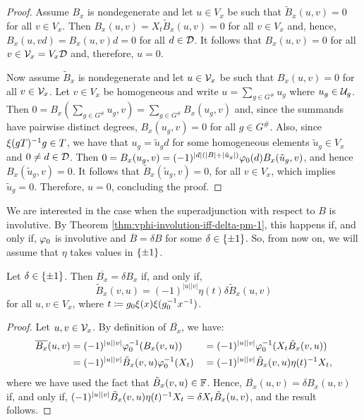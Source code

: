 \begin{proof}
	Assume $B_x$ is nondegenerate and let $u \in V_x$ be such that $\tilde{B}_x(u,v) = 0$ for all $v \in V_x$.
	Then $B_x(u, v) = X_{t} \tilde{B}_x(u,v) = 0$ for all $v \in V_x$ and, hence, $B_x(u, vd) = B_x(u, v)d = 0$ for all $d \in \mathcal{D}$.
	It follows that $B_x(u,v) = 0$ for all $v\in \mathcal V_x = V_x \mathcal{D}$ and, therefore, $u = 0$.

	Now assume $\tilde{B}_x$ is nondegenerate and let $u \in \mathcal V_x$ be such that $B_x (u,v) = 0$ for all $v \in \mathcal V_x$.
	Let $v\in V_x$ be homogeneous and write $u = \sum_{g\in G^\#} u_g$ where $u_g \in \mathcal U_g$.
	Then $0 = B_x(\sum_{g\in G^\#} u_g, v) = \sum_{g\in G^\#} B_x(u_g, v)$ and, since the summands have pairwise distinct degrees, $B_x(u_g, v) = 0$ for all $g\in G^\#$.
	Also, since $\xi(gT)^{-1} g \in T$, we have that $u_g = \tilde u_g d$ for some homogeneous elements $\tilde u_g \in V_x$ and $0 \neq d \in \mathcal{D}$.
	Then $0 = B_x(u_g, v) = (-1)^{|d|(|B| + |\tilde u_g|)} \varphi_0(d) B_x(\tilde u_g, v)$, and hence $B_x(\tilde u_g, v) = 0$.
	It follows that $\tilde{B}_x(\tilde u_g, v) = 0$, for all $v\in V_x$, which implies $\tilde u_g = 0$.
	Therefore, $u = 0$, concluding the proof.
\end{proof}

We are interested in the case when the superadjunction with respect to $B$ is involutive.
By Theorem \ref{thm:vphi-involution-iff-delta-pm-1}, this happens if, and only if, $\varphi_0$ is involutive and $\overline B = \delta B$ for some $\delta \in \{ \pm 1 \}$.
So, from now on, we will assume that $\eta$ takes values in $\{ \pm 1 \}$.

\begin{lemma}\label{lemma:B_x-delta}
	Let $\delta \in \{ \pm 1 \}$.
	Then $\overline{B_x} = \delta B_x$ if, and only if,
	\[
		\tilde{B}_x (v, u) = (-1)^{|u| |v|} \eta(t) \delta \tilde{B}_x (u, v)
	\]
	for all $u, v \in V_x$, where $t \coloneqq g_0 \xi(x) \xi(g_0^{-1} x^{-1})$.
\end{lemma}

\begin{proof}
	Let $u,v \in \mathcal V_x$.
	By definition of $\overline{B_x}$, we have:
	\begin{alignat*}{3}
		\overline{B_x} (u, v) & = (-1)^{|u||v|} \varphi_0^{-1}( B_x(v, u) )
		                      &                                                  & = (-1)^{|u||v|} \varphi_0^{-1}( X_t \tilde{B}_x(v, u) ) \\
		                      & = (-1)^{|u||v|} \tilde{B}_x(v, u) \varphi_0^{-1}(X_t)
		                      &                                                  & = (-1)^{|u||v|} \tilde{B}_x(v, u) \eta(t)^{-1} X_t,
	\end{alignat*}
	where we have used the fact that $\tilde B_x (v, u) \in \mathbb{F}$.
	Hence, $\overline{B_x} (u, v) = \delta {B_x} (u, v)$ if, and only if,
	$(-1)^{|u||v|} \tilde{B}_x(v, u) \eta(t)^{-1} X_t = \delta X_t \tilde{B}_x(u, v)$, and the result follows.
\end{proof}

